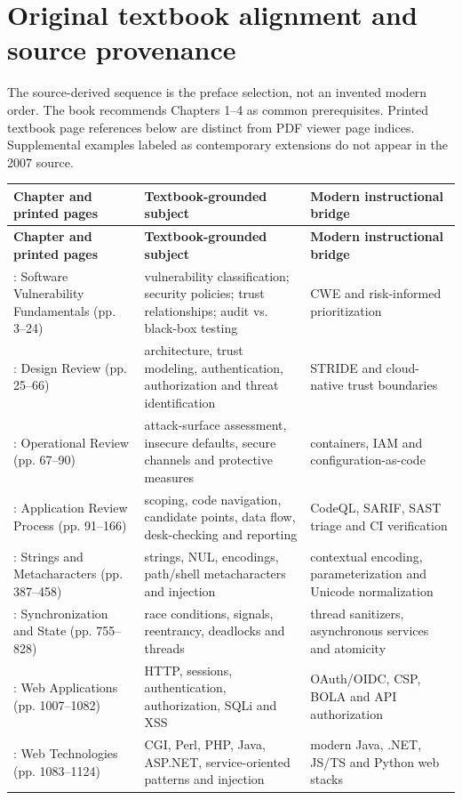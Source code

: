 \documentclass[10pt,letterpaper]{article}
\begin{document}
\section{Original textbook alignment and source provenance}
The source-derived sequence is the preface selection, not an invented modern order. The book recommends Chapters 1--4 as common prerequisites. Printed textbook page references below are distinct from PDF viewer page indices. Supplemental examples labeled as contemporary extensions do not appear in the 2007 source.

\begingroup\footnotesize\setlength\tabcolsep{3pt}
\begin{longtable}{>{\raggedright\arraybackslash}p{}>{\raggedright\arraybackslash}p{}>{\raggedright\arraybackslash}p{}}\toprule
\textbf{Chapter and printed pages} & \textbf{Textbook-grounded subject} & \textbf{Modern instructional bridge}\\\midrule\endfirsthead
\toprule \textbf{Chapter and printed pages} & \textbf{Textbook-grounded subject} & \textbf{Modern instructional bridge}\\\midrule\endhead
1: Software Vulnerability Fundamentals (pp. 3--24) & vulnerability classification; security policies; trust relationships; audit vs. black-box testing & CWE and risk-informed prioritization\\\midrule
2: Design Review (pp. 25--66) & architecture, trust modeling, authentication, authorization and threat identification & STRIDE and cloud-native trust boundaries\\\midrule
3: Operational Review (pp. 67--90) & attack-surface assessment, insecure defaults, secure channels and protective measures & containers, IAM and configuration-as-code\\\midrule
4: Application Review Process (pp. 91--166) & scoping, code navigation, candidate points, data flow, desk-checking and reporting & CodeQL, SARIF, SAST triage and CI verification\\\midrule
8: Strings and Metacharacters (pp. 387--458) & strings, NUL, encodings, path/shell metacharacters and injection & contextual encoding, parameterization and Unicode normalization\\\midrule
13: Synchronization and State (pp. 755--828) & race conditions, signals, reentrancy, deadlocks and threads & thread sanitizers, asynchronous services and atomicity\\\midrule
17: Web Applications (pp. 1007--1082) & HTTP, sessions, authentication, authorization, SQLi and XSS & OAuth/OIDC, CSP, BOLA and API authorization\\\midrule
18: Web Technologies (pp. 1083--1124) & CGI, Perl, PHP, Java, ASP.NET, service-oriented patterns and injection & modern Java, .NET, JS/TS and Python web stacks\\\midrule
\bottomrule\end{longtable}\endgroup
\end{document}
